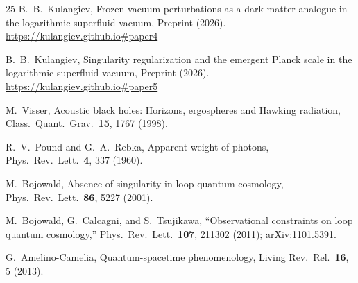 \documentclass[12pt, a4paper]{article}
\begin{document}
\begin{thebibliography}{25}
B.~B.~Kulangiev,
Frozen vacuum perturbations as a dark matter analogue
in the logarithmic superfluid vacuum,
Preprint (2026).
\url{https://kulangiev.github.io#paper4}

B.~B.~Kulangiev,
Singularity regularization and the emergent Planck scale in the logarithmic superfluid vacuum,
Preprint (2026).
\url{https://kulangiev.github.io#paper5}

M.~Visser,
Acoustic black holes: Horizons, ergospheres and Hawking
radiation,
Class.\ Quant.\ Grav.\ \textbf{15}, 1767 (1998).

R.~V.~Pound and G.~A.~Rebka,
Apparent weight of photons,
Phys.\ Rev.\ Lett.\ \textbf{4}, 337 (1960).

M.~Bojowald,
Absence of singularity in loop quantum cosmology,
Phys.\ Rev.\ Lett.\ \textbf{86}, 5227 (2001).

M.~Bojowald, G.~Calcagni, and S.~Tsujikawa,
``Observational constraints on loop quantum cosmology,''
Phys.\ Rev.\ Lett.\ \textbf{107}, 211302 (2011);
arXiv:1101.5391.

G.~Amelino-Camelia,
Quantum-spacetime phenomenology,
Living Rev.\ Rel.\ \textbf{16}, 5 (2013).

\end{thebibliography}
\end{document}
